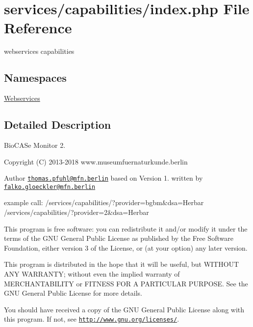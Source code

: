 \hypertarget{services_2capabilities_2index_8php}{}\section{services/capabilities/index.php File Reference}
\label{services_2capabilities_2index_8php}


webservices capabilities  


\subsection*{Namespaces}
\begin{DoxyCompactItemize}
\item 
 \hyperlink{namespace_webservices}{Webservices}
\end{DoxyCompactItemize}


\subsection{Detailed Description}
Bio\+C\+A\+Se Monitor 2.

\begin{DoxyCopyright}{Copyright}
(C) 2013-\/2018 www.\+museumfuernaturkunde.\+berlin 
\end{DoxyCopyright}
\begin{DoxyAuthor}{Author}
\href{mailto:thomas.pfuhl@mfn.berlin}{\tt thomas.\+pfuhl@mfn.\+berlin} based on Version 1. written by \href{mailto:falko.gloeckler@mfn.berlin}{\tt falko.\+gloeckler@mfn.\+berlin}
\end{DoxyAuthor}
example call\+: /services/capabilities/?provider=bgbm\&dsa=Herbar /services/capabilities/?provider=2\&dsa=Herbar

This program is free software\+: you can redistribute it and/or modify it under the terms of the G\+NU General Public License as published by the Free Software Foundation, either version 3 of the License, or (at your option) any later version.

This program is distributed in the hope that it will be useful, but W\+I\+T\+H\+O\+UT A\+NY W\+A\+R\+R\+A\+N\+TY; without even the implied warranty of M\+E\+R\+C\+H\+A\+N\+T\+A\+B\+I\+L\+I\+TY or F\+I\+T\+N\+E\+SS F\+OR A P\+A\+R\+T\+I\+C\+U\+L\+AR P\+U\+R\+P\+O\+SE. See the G\+NU General Public License for more details.

You should have received a copy of the G\+NU General Public License along with this program. If not, see \href{http://www.gnu.org/licenses/}{\tt http\+://www.\+gnu.\+org/licenses/}. 